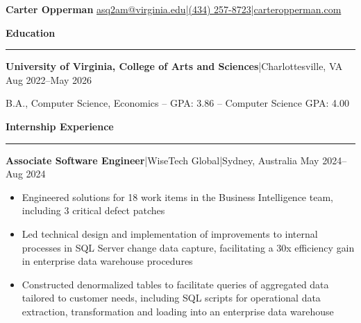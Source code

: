 \documentclass[11pt,letterpaper]{article}
\newcommand{\horibar}[2]{#1\hspace{5pt}|\hspace{5pt}#2}
\newcommand{\sep}[1]{\par\vspace{#1}}
\renewenvironment{section}[1]{
\sep{11pt}
{
\fontsize{14}{2}
\selectfont
\textbf{#1}\\[0.5pt]
}
\sep{6pt}
\noindent\rule{\linewidth}{0.5pt}
\sep{4pt}
}
{
}
\renewenvironment{subsection}[3]
{
\sep{4pt}
\horibar{\textbf{#1}}{#2} \hfill #3
\par\setstretch{1}
\begin{itemize}
}
{
\end{itemize}
\setstretch{0}
}
\begin{document}
{\fontsize{20}{1} \selectfont \textbf{Carter Opperman}} \hfill \horibar{\href{mailto:asq2am@virginia.edu}{asq2am@virginia.edu}}{\horibar{\href{tel:+14342578723}{(434) 257-8723}}{\href{https://carteropperman.com}{carteropperman.com}}}
\sep{5pt}

\begin{section}{Education}
    \sep{4pt}
    \horibar{\textbf{University of Virginia, College of Arts and Sciences}}{Charlottesville, VA} \hfill Aug 2022–May 2026
    \sep{4pt}
    \par\hspace{6pt}B.A., Computer Science, Economics  –  GPA: 3.86  –  Computer Science GPA: 4.00
    \sep{2pt}
\end{section}

\begin{section}{Internship Experience}
    \begin{subsection}{Associate Software Engineer}{\horibar{WiseTech Global}{Sydney, Australia}}{May 2024–Aug 2024}
        \item Engineered solutions for 18 work items in the Business Intelligence team, including 3 critical defect patches
        \item Led technical design and implementation of improvements to internal processes in SQL Server change data capture, facilitating a 30x efficiency gain in enterprise data warehouse procedures
        \item Constructed denormalized tables to facilitate queries of aggregated data tailored to customer needs, including SQL scripts for operational data extraction, transformation and loading into an enterprise data warehouse
    \end{subsection}
\end{section}
\end{document}
